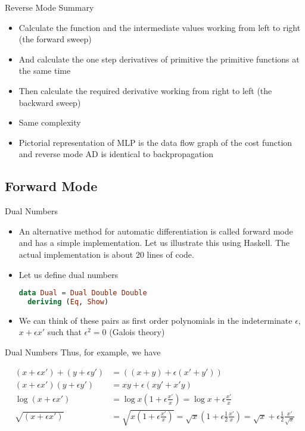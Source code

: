 \documentclass{beamer}
\begin{document}
\begin{frame}[fragile]{Reverse Mode Summary}

\begin{itemize}
\pause
\item Calculate the function and the intermediate values working from
  left to right (the forward sweep)
\pause
\item And calculate the one step derivatives of primitive the
  primitive functions at the same time
\pause
\item Then calculate the required derivative working from right to
  left (the backward sweep)
\pause
\item Same complexity
\pause
\item Pictorial representation of MLP is the data flow graph of the cost
  function and reverse mode AD is identical to backpropagation
\end{itemize}

\end{frame}

\subsection{Forward Mode}

\begin{frame}[fragile]{Dual Numbers}
\begin{itemize}
\item
An alternative method for automatic differentiation is called forward
mode and has a simple implementation. Let us illustrate this using
Haskell. The actual implementation is about 20 lines of code.
\pause
\item
Let us define dual numbers

\begin{lstlisting}[language=Haskell]
data Dual = Dual Double Double
  deriving (Eq, Show)
\end{lstlisting}
\pause
\item
We can think of these pairs as first order polynomials in the
indeterminate $\epsilon$, $x + \epsilon x'$ such that $\epsilon^2 = 0$
(Galois theory)
\end{itemize}
\end{frame}

\begin{frame}[fragile]{Dual Numbers}
Thus, for example, we have

$$
\begin{aligned}
(x + \epsilon x') + (y + \epsilon y') &= ((x + y) + \epsilon (x' + y')) \\
(x + \epsilon x')(y + \epsilon y') &= xy + \epsilon (xy' + x'y) \\
\log (x + \epsilon x') &=
\log x (1 + \epsilon \frac {x'}{x}) =
\log x + \epsilon\frac{x'}{x} \\
\sqrt{(x + \epsilon x')} &=
\sqrt{x(1 + \epsilon\frac{x'}{x})} =
\sqrt{x}(1 + \epsilon\frac{1}{2}\frac{x'}{x}) =
\sqrt{x} + \epsilon\frac{1}{2}\frac{x'}{\sqrt{x}}
\end{aligned}
$$
\end{frame}
\end{document}
